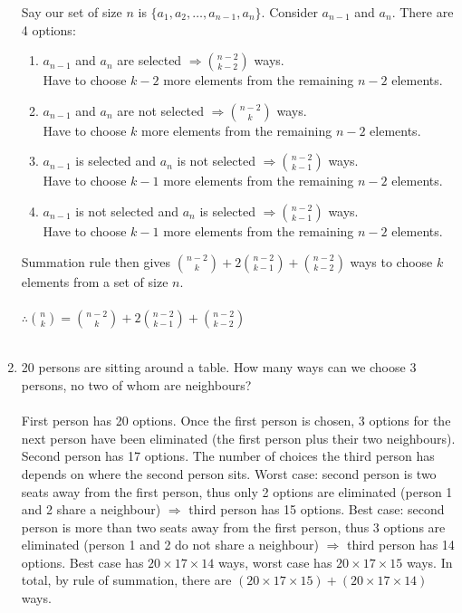 \documentclass[10pt,a4paper,final]{article}
\begin{document}
\begin{enumerate}
Say our set of size $n$ is $\{a_1, a_2, \dots, a_{n-1}, a_n\}$.
Consider $a_{n-1}$ and $a_n$. There are 4 options:
\begin{enumerate}
\item $a_{n-1}$ and $a_n$ are selected $\Rightarrow \binom{n-2}{k-2}$ ways.\\
Have to choose $k-2$ more elements from the remaining $n-2$ elements.
\item $a_{n-1}$ and $a_n$ are not selected $\Rightarrow \binom{n-2}{k}$ ways.\\
Have to choose $k$ more elements from the remaining $n-2$ elements.
\item $a_{n-1}$ is selected and $a_n$ is not selected $\Rightarrow \binom{n-2}{k-1}$ ways.\\
Have to choose $k-1$ more elements from the remaining $n-2$ elements.
\item $a_{n-1}$ is not selected and $a_n$ is selected $\Rightarrow \binom{n-2}{k-1}$ ways.\\
Have to choose $k-1$ more elements from the remaining $n-2$ elements.
\end{enumerate}
Summation rule then gives
$\binom{n-2}{k} + 2 \binom{n-2}{k-1} + \binom{n-2}{k-2}$ ways to choose $k$ elements
from a set of size $n$.\\ \\
$\therefore \binom{n}{k} = \binom{n-2}{k} + 2 \binom{n-2}{k-1} + \binom{n-2}{k-2}$\\
\\
\item %
20 persons are sitting around a table.
How many ways can we choose 3 persons, no two of whom are neighbours?\\
\\
First person has 20 options. Once the first person is chosen,
3 options for the next person have been eliminated (the first person plus their two neighbours).
Second person has 17 options. The number of choices the third person has depends
on where the second person sits.
Worst case: second person is two seats away from the first person,
thus only 2 options are eliminated (person 1 and 2 share a neighbour)
$\Rightarrow$ third person has 15 options.
Best case: second person is more than two seats away from the first person, thus 3 options
are eliminated (person 1 and 2 do not share a neighbour) $\Rightarrow$ third person has 14 options.
Best case has $20 \times 17 \times 14$ ways, worst case has $20 \times 17 \times 15$ ways.
In total, by rule of summation, there are $(20 \times 17 \times 15)+(20 \times 17 \times 14)$ ways.
\end{enumerate}
\end{document}
